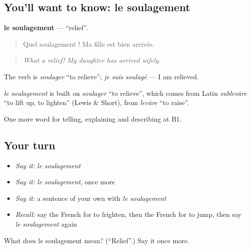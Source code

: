 \subsection*{You'll want to know: le soulagement}
\textbf{le soulagement} — \textquotedblleft{}relief\textquotedblright{}.

\begin{quote}
Quel soulagement ! Ma fille est bien arrivée.
\end{quote}

\begin{quote}
\emph{What a relief! My daughter has arrived safely.}
\end{quote}

The verb is \emph{soulager} \textquotedblleft{}to relieve\textquotedblright{}; \emph{je suis soulagé} — I am relieved.

\begin{cousinweb}
\emph{le soulagement} is built on \emph{soulager} \textquotedblleft{}to relieve\textquotedblright{}, which comes from Latin \emph{sublevāre} \textquotedblleft{}to lift up, to lighten\textquotedblright{} (Lewis \& Short), from \emph{levāre} \textquotedblleft{}to raise\textquotedblright{}.
\end{cousinweb}

\begin{grammarlens}[title={What you've built}]
One more word for telling, explaining and describing at B1.
\end{grammarlens}

\subsection*{Your turn}
\begin{itemize}
\raggedright
  \item \emph{Say it:} \emph{le soulagement}
  \item \emph{Say it:} \emph{le soulagement}, once more
  \item \emph{Say it:} a sentence of your own with \emph{le soulagement}
  \item \emph{Recall:} say the French for to frighten, then the French for to jump, then say \emph{le soulagement} again
\end{itemize}

\begin{tcolorbox}[breakable,colback=teal!4,colframe=teal!35!black,title={Before you move on}]
What does le soulagement mean? (\textquotedblleft{}Relief\textquotedblright{}.) Say it once more.
\end{tcolorbox}
